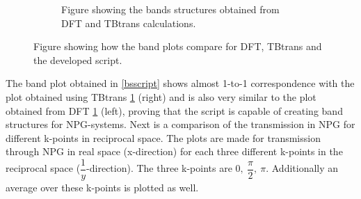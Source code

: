 \begin{figure}[H]
\begin{subfigure}[t]{0.45\textwidth}
		\caption{Figure showing the bands structures obtained from DFT and TBtrans calculations.}
		\label{bsdfttbt}
	\end{subfigure}
	\caption{Figure showing how the band plots compare for DFT, TBtrans and the developed script.}\label{bandcompare}
\end{figure}
The band plot obtained in \cref{bsscript} shows almost 1-to-1 correspondence with the plot obtained using TBtrans \cref{bsdfttbt} (right) and is also very similar to the plot obtained from DFT \cref{bsdfttbt} (left), proving that the script is capable of creating band structures for NPG-systems. Next is a comparison of the transmission in NPG for different k-points in reciprocal space. The plots are made for transmission through NPG in real space (x-direction) for each three different k-points in the reciprocal space (\(\dfrac{1}{y}\)-direction). The three k-points are \(0,\ \dfrac{\pi}{2},\ \pi\). Additionally an average over these k-points is plotted as well.
